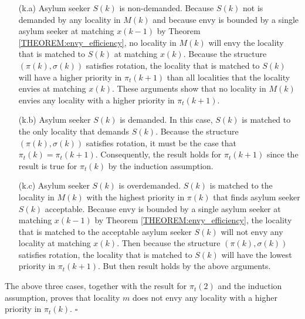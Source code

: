 \documentclass[12pt,fleqn]{article}
\begin{document}
\begin{itemize}

\item[(k.a)] Asylum seeker $S(k)$ is non-demanded. Because $S(k)$ not is demanded by any locality in $M(k)$
and because envy is bounded by a single asylum seeker at matching $x(k-1)$ by Theorem \ref{THEOREM:envy_efficiency}, no
locality in $M(k)$ will envy the locality that is matched to $S(k)$ at matching $x(k)$. Because the structure
$(\pi(k),\sigma(k))$ satisfies rotation, the locality that is matched to $S(k)$ will have a higher priority
in $\pi_t(k+1)$ than all localities that the locality envies at matching $x(k)$. These arguments show that
no locality in $M(k)$ envies any locality with a higher priority in $\pi_t(k+1)$.

\item[(k.b)] Asylum seeker $S(k)$ is demanded. In this case, $S(k)$ is matched to the only locality that demands
$S(k)$. Because the structure $(\pi(k),\sigma(k))$ satisfies rotation, it must be the case that $\pi_t(k)=\pi_t(k+1)$. Consequently, the result holds for $\pi_t(k+1)$ since the result is true for $\pi_t(k)$ by the induction assumption.

\item[(k.c)] Asylum seeker $S(k)$ is overdemanded. $S(k)$ is matched to the locality in $M(k)$ with the highest
priority in $\pi(k)$ that finds asylum seeker $S(k)$ acceptable. Because envy is bounded by a single asylum seeker
at matching $x(k-1)$ by Theorem \ref{THEOREM:envy_efficiency}, the locality that is matched to the acceptable asylum seeker $S(k)$ will
not envy any locality at matching $x(k)$. Then because the structure $(\pi(k),\sigma(k))$ satisfies rotation,
the locality that is matched to $S(k)$ will have the lowest priority in $\pi_t(k+1)$. But then result holds by the above arguments.

\end{itemize}

\noindent The above three cases, together with the result for $\pi_t(2)$ and the induction assumption, proves that
locality $m$ does not envy any locality with a higher priority in $\pi_t(k)$. \hfill $\square$

\medskip
\end{document}
